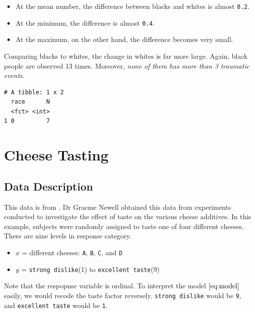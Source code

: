 \documentclass[]{book}
\providecommand{\tightlist}{%
  \setlength{\itemsep}{0pt}\setlength{\parskip}{0pt}}
\begin{document}
\begin{itemize}
\tightlist
\item
  At the mean number, the difference between blacks and whites is almost \texttt{0.2}.
\item
  At the minimum, the difference is almost \texttt{0.4}.
\item
  At the maximum, on the other hand, the difference becomes very small.
\end{itemize}

Comparing blacks to whites, the change in whites is far more large. Again, black people are observed 13 times. Moreover, \emph{none of them has more than 3 traumatic events}.

\begin{verbatim}
# A tibble: 1 x 2
  race      N
  <fct> <int>
1 0         7
\end{verbatim}

\hypertarget{cheese-tasting}{%
\section{Cheese Tasting}\label{cheese-tasting}}

\hypertarget{data-description}{%
\subsection{Data Description}\label{data-description}}

This data is from \citet{McCullagh:1989aa}. Dr Graeme Newell obtained this data from experiments conducted to investigate the effect of taste on the various cheese additives. In this example, subjects were randomly assigned to taste one of four different cheeses. There are nine levels in response category.

\begin{itemize}
\tightlist
\item
  \(x\) = different cheeses: \texttt{A}, \texttt{B}, \texttt{C}, and \texttt{D}
\item
  \(y\) = \texttt{strong\ dislike}(1) to \texttt{excellent\ taste}(9)
\end{itemize}

Note that the respopnse variable is ordinal. To interpret the model \(\eqref{eq:model}\) easily, we would recode the taste factor reversely. \texttt{strong\ dislike} would be \texttt{9}, and \texttt{excellent\ taste} would be \texttt{1}.
\end{document}
